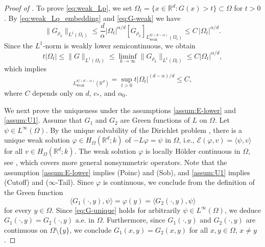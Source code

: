 \documentclass[reqno]{amsart}
\theoremstyle{plain}
\theoremstyle{definition}
\numberwithin{equation}{section}
\newcommand{\Rd}{\mathbb{R}^d}
\newcommand{\cl} {c_{\ast}}
\begin{document}
\begin{proof} [Proof of ]
To prove \eqref{eq:weak_Lp}, we set $\Omega_{t}=\lbrace x\in \Rd: G(x)>t \rbrace \subset \Omega$ for $t>0$. By \eqref{eq:weak_Lq_embedding} and \eqref{eq:G-weak} we have
\begin{equation*}
\|G_{\rho_{k}}\|_{L^{1}(\Omega_{t})} \leq \frac{d}{\alpha} |\Omega_{t}|^{\alpha/d} [G_{\rho_{k}}]_{L^{d/(d-\alpha)}_{\mathrm{weak}}(\Omega_{t})} \leq C \,|\Omega_{t}|^{\alpha/d}.
\end{equation*}
Since the $L^{1}$-norm is weakly lower semicontinuous, we obtain
\begin{equation*}
t |\Omega_{t}| \leq \|G\|_{L^{1}(\Omega_{t})} \leq \liminf_{k \to \infty} \|G_{\rho_{k}}\|_{L^{1}(\Omega_{t})} \leq C |\Omega_{t}|^{\alpha/d},
\end{equation*}
which implies
\begin{equation*}
[G]_{L^{d/(d-\alpha)}_{\mathrm{weak}}(\Rd)} = \sup_{t > 0} t |\Omega_{t}|^{(d-\alpha)/d} \leq C,
\end{equation*}
where $C$ depends only on $d$, $\cl$, and $\alpha_{0}$.

We next prove the uniqueness under the assumptions \eqref{assum:E-lower} and \eqref{assum:U1}. Assume that $G_{1}$ and $G_{2}$ are Green functions of $L$ on $\Omega$. Let $\psi \in L^{\infty}(\Omega)$. By the unique solvability of the Dirichlet problem \cite[Proposition 3.4]{FKV15}, there is a unique weak solution $\varphi \in H_{\Omega}(\Rd; k)$ of $-L\varphi=\psi$ in $\Omega$, i.e., $\mathcal{E}(\varphi, v)=\langle \psi, v \rangle$ for all $v \in H_{\Omega}(\Rd; k)$. The weak solution $\varphi$ is locally H\"older continuous in $\Omega$, see \cite[Theorem 1.1 (ii)]{KaWe22}, which covers more general nonsymmetric operators. Note that the assumption \eqref{assum:E-lower} implies (Poinc) and (Sob), and \eqref{assum:U1} implies (Cutoff) and ($\infty$-Tail). Since $\varphi$ is continuous, we conclude from the definition of the Green function
\begin{equation} \label{eq:G-unique}
\langle G_{1}(\cdot, y), \psi \rangle = \varphi(y) = \langle G_{2}(\cdot, y), \psi \rangle
\end{equation}
for every $y \in \Omega$. Since \eqref{eq:G-unique} holds for arbitrarily $\psi \in L^{\infty}(\Omega)$, we deduce $G_{1}(\cdot, y) = G_{2}(\cdot, y)$ a.e. in $\Omega$. Furthermore, since $G_{1}(\cdot, y)$ and $G_{2}(\cdot, y)$ are continuous on $\Omega \setminus \lbrace y \rbrace$, we conclude  $G_{1}(x, y) = G_{2}(x, y)$ for all $x, y \in \Omega$, $x\neq y$.
\end{proof}
\end{document}
